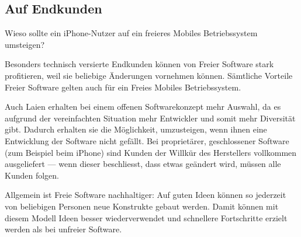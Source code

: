 \subsection{Auf Endkunden}
Wieso sollte ein iPhone-Nutzer auf ein freieres Mobiles Betriebssystem umsteigen?

Besonders technisch versierte Endkunden können von Freier Software stark profitieren, weil sie beliebige Änderungen vornehmen können. Sämtliche Vorteile Freier Software gelten auch für ein Freies Mobiles Betriebssystem.

Auch Laien erhalten bei einem offenen Softwarekonzept mehr Auswahl, da es aufgrund der vereinfachten Situation mehr Entwickler und somit mehr Diversität gibt. Dadurch erhalten sie die Möglichkeit, umzusteigen, wenn ihnen eine Entwicklung der Software nicht gefällt. Bei proprietärer, geschlossener Software (zum Beispiel beim iPhone) sind Kunden der Willkür des Herstellers vollkommen ausgeliefert --- wenn dieser beschliesst, dass etwas geändert wird, müssen alle Kunden folgen.

Allgemein ist Freie Software nachhaltiger: Auf guten Ideen können so jederzeit von beliebigen Personen neue Konstrukte gebaut werden. Damit können mit diesem Modell Ideen besser wiederverwendet und schnellere Fortschritte erzielt werden als bei unfreier Software.